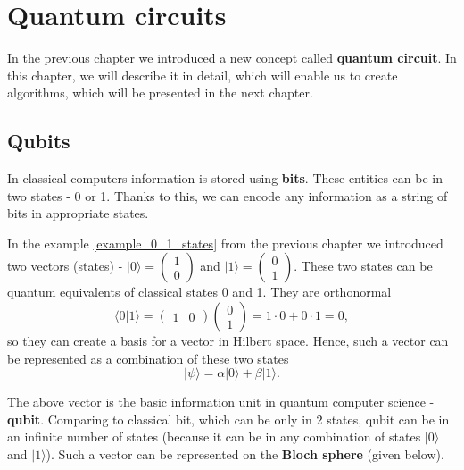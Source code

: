 \chapter{Quantum circuits}
\thispagestyle{chapterBeginStyle}
\label{chapter2}

In the previous chapter we introduced a new concept called \textbf{quantum circuit}. In this chapter, we will describe it in detail, which will enable us to create algorithms, which will be presented in the next chapter.

\section{Qubits}

In classical computers information is stored using \textbf{bits}. These entities can be in two states - 0 or 1. Thanks to this, we can encode any information as a string of bits in appropriate states.

In the example \ref{example_0_1_states} from the previous chapter we introduced two vectors (states) - $|0\rangle = \begin{pmatrix} 1 \\ 0 \end{pmatrix}$ and $|1\rangle = \begin{pmatrix} 0 \\ 1 \end{pmatrix}$. These two states can be quantum equivalents of classical states 0 and 1. They are orthonormal
\[ \langle 0 | 1 \rangle = \begin{pmatrix} 1 & 0\end{pmatrix} \begin{pmatrix} 0 \\ 1 \end{pmatrix} = 1 \cdot 0 + 0 \cdot 1 = 0,\]
so they can create a basis for a vector in Hilbert space. Hence, such a vector can be represented as a combination of these two states
\[ |\psi \rangle = \alpha |0\rangle + \beta |1\rangle. \]

The above vector is the basic information unit in quantum computer science - \textbf{qubit}. Comparing to classical bit, which can be only in 2 states, qubit can be in an infinite number of states (because it can be in any combination of states $|0\rangle$ and $|1\rangle$). Such a vector can be represented on the \textbf{Bloch sphere} (given below).


